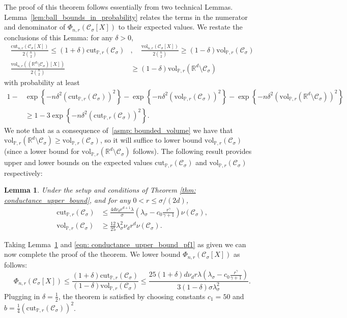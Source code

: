 \documentclass[11pt,twoside]{article}
\newtheorem{lemma}{Lemma}
\theoremstyle{definition}
\newcommand{\set}[1]{\left\{#1\right\}}
\newcommand{\vol}{\mathrm{vol}}
\newcommand{\cut}{\mathrm{cut}}
\newcommand{\Reals}{\mathbb{R}}
\newcommand{\Rd}{\Reals^d}
\newcommand{\1}{\mathbbm{1}}
\newcommand{\Xbf}{X}
\newcommand{\Pbb}{\mathbb{P}}
\newcommand{\Cset}{\mathcal{C}}
\newcommand{\Csig}{\Cset_{\sigma}}
\begin{document}
The proof of this theorem follows essentially from two technical Lemmas. 
Lemma~\ref{lem:ball_bounds_in_probability} relates the terms in the numerator and denominator of $\Phi_{n,r}(\Csig[\Xbf])$ to their expected values. We restate the conclusions of this Lemma: for any $\delta > 0$,
\begin{align}
\frac{\cut_{n,r}(\Csig[\Xbf])}{2{n \choose 2}} \leq (1 + \delta)\cut_{\Pbb,r}(\Csig) &, \quad \frac{\vol_{n,r}(\Csig[\Xbf])}{2{n \choose 2}} \geq (1 - \delta)\vol_{\Pbb,r}(\Csig) \nonumber \\ \frac{\vol_{n,r}((\Rd \setminus \Csig)[\Xbf])}{2{n \choose 2}}& \geq (1 - \delta)\vol_{\Pbb,r}(\Rd \setminus \Csig) \label{eqn: conductance_upper_bound_pf1}
\end{align}
with probability at least 
\begin{align*}
1 - & \exp\set{-n \delta^2 (\cut_{\Pbb,r}(\Csig))^2} - \exp\set{-n \delta^2 (\vol_{\Pbb,r}(\Csig))^2} - \exp\set{-n \delta^2 (\vol_{\Pbb,r}(\Rd\setminus \Csig))^2} \\
& \geq 1 - 3\exp\set{-n \delta^2 (\cut_{\Pbb,r}(\Csig))^2}.
\end{align*} 
We note that as a consequence of~\ref{asmp: bounded_volume} we have that $\vol_{\Pbb,r}(\Rd \setminus \Csig)  \geq \vol_{\Pbb,r}(\Csig)$, so it will suffice to lower bound $\vol_{\Pbb,r}(\Csig)$ (since a lower bound for $\vol_{\Pbb,r}(\Rd \setminus \Csig)$ follows).
The following result provides upper and lower bounds on the expected values $\cut_{\Pbb,r}(\Csig)$ and $\vol_{\Pbb,r}(\Csig)$ respectively:
\begin{lemma}
	\label{lem: expected_density_cut}\label{lem: expected_density_volume}
	Under the setup and conditions of Theorem \ref{thm: conductance_upper_bound}, and for any $0 < r \leq \sigma/(2d)$,
	\begin{align}
	\cut_{\Pbb,r}(\Csig) &\leq \frac{4 d \nu_d r^{d+1} \lambda}{\sigma} \left(\lambda_{\sigma} - c_0\frac{r^{\gamma}}{\gamma + 1}\right) \nu(\Csig), \label{eqn:claim_one} \\
	\vol_{\Pbb,r}(\Csig) &\geq \frac{12}{25} \lambda_{\sigma}^2 \nu_d r^d \nu(\Csig).\label{eqn:claim_two}
	\end{align}
\end{lemma}
Taking Lemma~\ref{lem: expected_density_cut} and \eqref{eqn: conductance_upper_bound_pf1} as given we can now complete the proof of the theorem. We lower bound $\Phi_{n,r}(\Csig[\Xbf])$ as follows:
\begin{equation*}
\Phi_{n,r}(\Csig[\Xbf]) \leq \frac{(1 + \delta)\cut_{\Pbb,r}(\Csig)}{(1 - \delta)\vol_{\Pbb,r}(\Csig)} \leq \frac{25(1 + \delta)d \nu_d r \lambda \left(\lambda_{\sigma} - c_0\frac{r^{\gamma}}{\gamma + 1}\right)}{3(1 - \delta) \sigma \lambda_{\sigma}^2}.
\end{equation*}
Plugging in $\delta = \frac{1}{2}$, the theorem is satisfied by choosing constants $c_1 = 50$ and $b = \frac{1}{4}(\cut_{\Pbb,r}(\Csig))^2$. 
\end{document}
